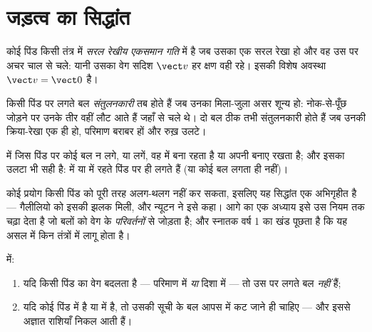 \section{जड़त्व का सिद्धांत}

\begin{definition}\label{def:g10:inertia:uniform}
कोई पिंड किसी तंत्र में \emph{सरल रेखीय एकसमान गति} में है जब उसका  एक सरल रेखा हो और वह उस पर अचर
चाल से चले: यानी उसका वेग सदिश $\vect v$ हर क्षण वही रहे।  इसकी विशेष
अवस्था $\vect v = \vect 0$ है।
\end{definition}

\begin{definition}[संतुलनकारी बल]\label{def:g10:inertia:compensate}
किसी पिंड पर लगते बल \emph{संतुलनकारी} तब
होते हैं जब उनका मिला-जुला असर शून्य हो: नोक-से-पूँछ जोड़ने पर उनके तीर
वहीं लौट आते हैं जहाँ से चले थे। दो बल ठीक तभी संतुलनकारी होते
हैं जब उनकी क्रिया-रेखा एक ही हो, परिमाण बराबर हों और रुख़ उलटे।
\end{definition}

\begin{theorem}[जड़त्व का सिद्धांत]\label{thm:g10:inertia:principle}
 में जिस पिंड पर कोई बल न लगे, या
 लगें, वह  में बना रहता है या अपनी
 बनाए रखता है; और इसका उलटा भी सही है:
 में या  में रहते पिंड पर
 ही लगते हैं (या कोई बल लगता ही नहीं)।
\end{theorem}
\admitted

\begin{remark}
कोई प्रयोग किसी पिंड को पूरी तरह अलग-थलग नहीं कर सकता, इसलिए यह सिद्धांत
एक अभिगृहीत है --- गैलीलियो को इसकी झलक मिली, और न्यूटन ने इसे कहा। आगे
का एक अध्याय इसे उस नियम तक चढ़ा देता है जो बलों को वेग के
\emph{परिवर्तनों} से जोड़ता है; और स्नातक वर्ष 1 का खंड पूछता है कि यह
असल में किन तंत्रों में लागू होता है।
\end{remark}

\begin{proposition}[बलों से गति पढ़ना, और गति से बल]\label{prop:g10:inertia:converse}
 में:
\begin{enumerate}
  \item यदि किसी पिंड का वेग बदलता है --- परिमाण में \emph{या} दिशा में
        --- तो उस पर लगते बल  \emph{नहीं} हैं;
  \item यदि कोई पिंड  में है या  में
        है, तो उसकी सूची के बल आपस में कट जाने ही चाहिए --- और
        इससे अज्ञात राशियाँ निकल आती हैं।
\end{enumerate}
\end{proposition}

